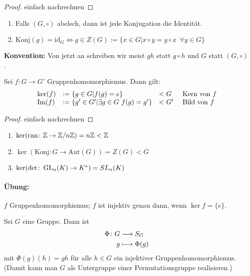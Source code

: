 \documentclass[12pt,a4paper]{scrartcl}
\begin{document}
\begin{proof}
	einfach nachrechnen
\end{proof}

\begin{bem}
	\leavevmode
	\begin{enumerate}
		\item 	Falls $(G,\circ)$ abelsch, dann ist jede Konjugation die Identität.
		\item $\text{Konj}(g) = \text{id}_G \Leftrightarrow g\in Z(G):=\{x\in G|x\circ y = y\circ x\enspace \forall y\in G\}$
	\end{enumerate}
\end{bem}

\noindent\textbf{Konvention:} Von jetzt an schreiben wir meist $gh$ statt $g\circ h$ und $G$ statt $(G,\circ)$.

\begin{satz} \label{thm:kerim_g}
	Sei $f\colon G\to G'$ Gruppenhomomorphismus. Dann gilt:	
	\begin{equation*}
	\begin{array}{llll}
		\operatorname{ker}(f) & := \{g\in G|f(g) = e\}                  & <G & \mbox{ Kern von }f\\
		\operatorname{Im}(f)  & := \{g'\in G'|\exists g\in G\ f(g)=g'\} & <G'& \text{ Bild von }f
	\end{array}
	\end{equation*}
\end{satz}

\begin{proof}
	einfach nachrechnen
\end{proof}
\begin{bsp}
	\leavevmode
	\begin{enumerate}
		\item $\operatorname{ker}(\text{can}\colon \mathbb Z\to \mathbb Z/n\mathbb Z) = n\mathbb Z<\mathbb Z$
		\item $\ker(\text{Konj}\colon G\to \text{Aut}(G)) = Z(G)<G$
		\item $\operatorname{ker}(\det\colon \operatorname{GL}_n(K)\to K^*) = SL_n(K)$
	\end{enumerate}
\end{bsp}

\paragraph{Übung:} $f$ Gruppenhomomorphismus; $f$ ist injektiv genau dann, wenn $\ker f = \{e\}$.

\begin{satz} \label{thm:cayley}
	Sei $G$ eine Gruppe. Dann ist
	\begin{align*}
		\Phi \colon G&\longrightarrow S_G\\
		g&\longmapsto \Phi(g)
	\end{align*} mit $\Phi(g)(h) = gh$ für alle $h\in G$ ein injektiver Gruppenhomomorphismus. (Damit kann man $G$ als Untergruppe einer Permutationsgruppe \glqq realisieren\grqq.)
\end{satz}
\end{document}
